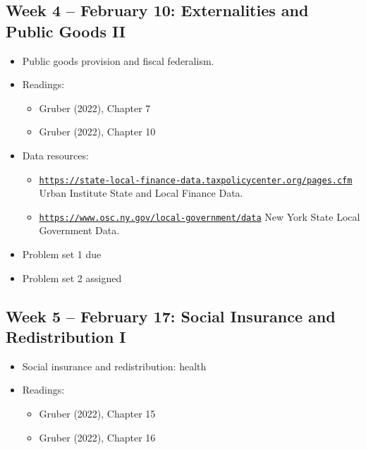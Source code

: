 \documentclass[11pt]{article}
\begin{document}
\subsection*{Week 4 -- February 10: Externalities and Public Goods II}
\begin{itemize}
    \setlength{\itemsep}{0em}
    \item Public goods provision and fiscal federalism.
    \item Readings:
    \begin{itemize}
        \item Gruber (2022), Chapter 7
        \item Gruber (2022), Chapter 10
    \end{itemize}
    \item Data resources:
    \begin{itemize}
    \setlength{\itemsep}{0em}
    \item \href{https://state-local-finance-data.taxpolicycenter.org/pages.cfm}{\nolinkurl{https://state-local-finance-data.taxpolicycenter.org/pages.cfm}} Urban Institute State and Local Finance Data.
    \item \href{https://www.osc.ny.gov/local-government/data}{\nolinkurl{https://www.osc.ny.gov/local-government/data}} New York State Local Government Data.
    \end{itemize}
    \item Problem set 1 due
    \item Problem set 2 assigned
\end{itemize}

\subsection*{Week 5 -- February 17: Social Insurance and Redistribution I}
\begin{itemize}
    \setlength{\itemsep}{0em}
    \item Social insurance and redistribution: health
    \item Readings:
    \begin{itemize}
        \item Gruber (2022), Chapter 15
        \item Gruber (2022), Chapter 16
    \end{itemize}
\end{itemize}
\end{document}
